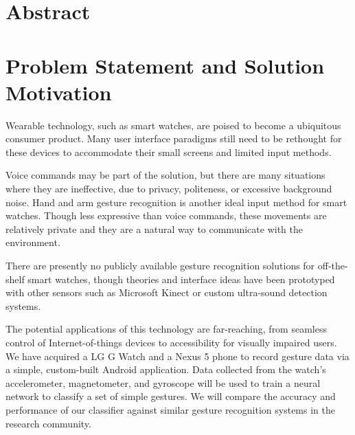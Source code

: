 \documentclass{article}
\begin{document}

\section{Abstract}


\section{Problem Statement and Solution Motivation}


Wearable technology, such as smart watches, are poised to become a ubiquitous consumer product. Many user interface paradigms still need to be rethought for these devices to accommodate their small screens and limited input methods.

Voice commands may be part of the solution, but there are many situations where they are ineffective, due to privacy, politeness, or excessive background noise.
Hand and arm gesture recognition is another ideal input method for smart watches. Though less expressive than voice commands, these movements are relatively private and they are a natural way to communicate with the environment.

There are presently no publicly available gesture recognition solutions for off-the-shelf smart watches, though theories and interface ideas have been prototyped with other sensors such as Microsoft Kinect or custom ultra-sound detection systems.

The potential applications of this technology are far-reaching, from seamless control of Internet-of-things devices to accessibility for visually impaired users.
We have acquired a LG G Watch and a Nexus 5 phone to record gesture data via a simple, custom-built Android  application. Data collected from the watch’s accelerometer, magnetometer, and gyroscope will be used to train a neural network to classify a set of simple gestures. We will compare the accuracy and performance of our classifier against similar gesture recognition systems in the research community.
\end{document}
